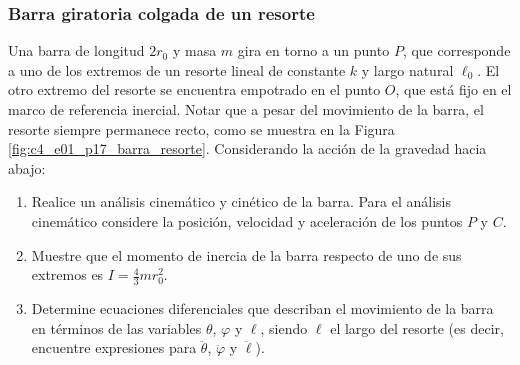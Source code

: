 \subsubsection{Barra giratoria colgada de un resorte}

Una barra de longitud $2r_0$ y masa $m$ gira en torno a un punto $P$, que corresponde a uno de
los extremos de un resorte lineal de constante $k$ y largo natural $\ell_0$. El otro extremo del
resorte se encuentra empotrado en el punto $O$, que está fijo en el marco de referencia inercial.
Notar que a pesar del movimiento de la barra, el resorte siempre permanece recto, como se muestra
en la Figura \ref{fig:c4_e01_p17_barra_resorte}. Considerando la acción de la gravedad hacia abajo:

\begin{enumerate}
    \item Realice un análisis cinemático y cinético de la barra. Para el análisis cinemático
          considere la posición, velocidad y aceleración de los puntos $P$ y $C$.
    \item Muestre que el momento de inercia de la barra respecto de uno de sus extremos es
          $I = \frac{4}{3}mr_0^2$.
    \item Determine ecuaciones diferenciales que describan el movimiento de la barra en términos
          de las variables $\theta$, $\varphi$ y $\ell$, siendo $\ell$ el largo del resorte (es
          decir, encuentre expresiones para $\ddot{\theta}$, $\ddot{\varphi}$ y $\ddot{\ell}$).
\end{enumerate}

